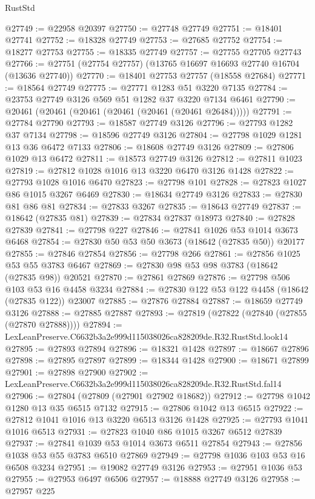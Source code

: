 \begin{lexlean}{RustStd}
\begin{coremodule}
@27749 := @22958 @20397
@27750 := @27748 @27749
@27751 := @18401 @27741
@27752 := @18328 @27749
@27753 := @27685 @27752
@27754 := @18277 @27753
@27755 := @18335 @27749
@27757 := @27755 @27705 @27743
@27766 := @27751 (@27754 @27757) (@13765 @16697 @16693 @27740 @16704 (@13636 @27740))
@27770 := @18401 @27753 @27757 (@18558 @27684)
@27771 := @18564 @27749
@27775 := @27771 @1283 @51 @3220 @7135
@27784 := @23753 @27749 @3126 @569 @51 @1282 @37 @3220 @7134 @6461
@27790 := @20461 (@20461 (@20461 (@20461 (@20461 (@20461 @26484)))))
@27791 := @27784 @27790
@27793 := @18587 @27749 @3126
@27796 := @27793 @1282 @37 @7134
@27798 := @18596 @27749 @3126
@27804 := @27798 @1029 @1281 @13 @36 @6472 @7133
@27806 := @18608 @27749 @3126
@27809 := @27806 @1029 @13 @6472
@27811 := @18573 @27749 @3126
@27812 := @27811 @1023
@27819 := @27812 @1028 @1016 @13 @3220 @6470 @3126 @1428
@27822 := @27793 @1028 @1016 @6470
@27823 := @27798 @101
@27828 := @27823 @1027 @86 @1015 @3267 @6469
@27830 := @18634 @27749 @3126
@27833 := @27830 @81 @86 @81
@27834 := @27833 @3267
@27835 := @18643 @27749
@27837 := @18642 (@27835 @81)
@27839 := @27834 @27837 @18973
@27840 := @27828 @27839
@27841 := @27798 @227
@27846 := @27841 @1026 @53 @1014 @3673 @6468
@27854 := @27830 @50 @53 @50 @3673 (@18642 (@27835 @50)) @20177
@27855 := @27846 @27854
@27856 := @27798 @266
@27861 := @27856 @1025 @53 @55 @3783 @6467
@27869 := @27830 @98 @53 @98 @3783 (@18642 (@27835 @98)) @20521
@27870 := @27861 @27869
@27876 := @27798 @506 @103 @53 @16 @4458 @3234
@27884 := @27830 @122 @53 @122 @4458 (@18642 (@27835 @122)) @23007
@27885 := @27876 @27884
@27887 := @18659 @27749 @3126
@27888 := @27885 @27887
@27893 := @27819 (@27822 (@27840 (@27855 (@27870 @27888))))
@27894 := LexLeanPreserve.C6632b3a2e999d115038026ca828209de.R32.RustStd.look14
@27895 := @27893 @27894
@27896 := @18321 @1428
@27897 := @18667 @27896
@27898 := @27895 @27897
@27899 := @18344 @1428
@27900 := @18671 @27899
@27901 := @27898 @27900
@27902 := LexLeanPreserve.C6632b3a2e999d115038026ca828209de.R32.RustStd.fal14
@27906 := @27804 (@27809 (@27901 @27902 @18682))
@27912 := @27798 @1042 @1280 @13 @35 @6515 @7132
@27915 := @27806 @1042 @13 @6515
@27922 := @27812 @1041 @1016 @13 @3220 @6513 @3126 @1428
@27925 := @27793 @1041 @1016 @6513
@27931 := @27823 @1040 @86 @1015 @3267 @6512 @27839
@27937 := @27841 @1039 @53 @1014 @3673 @6511 @27854
@27943 := @27856 @1038 @53 @55 @3783 @6510 @27869
@27949 := @27798 @1036 @103 @53 @16 @6508 @3234
@27951 := @19082 @27749 @3126
@27953 := @27951 @1036 @53
@27955 := @27953 @6497 @6506
@27957 := @18888 @27749 @3126
@27958 := @27957 @225

\end{coremodule}
\end{lexlean}
